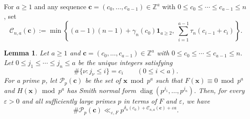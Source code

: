 \documentclass[a4paper,11pt, twoside,reqno]{amsart}
\theoremstyle{plain}
\newtheorem{lemma}[thm]{Lemma}
\theoremstyle{definition}
\theoremstyle{remark}
\newcommand{\bfx}{\bm{x}}
\newcommand{\bfc}{\bm{c}}
\newcommand{\ZZ}{\mathbb{Z}}
\newcommand{\ve}{\varepsilon}
\renewcommand{\le}{\leqslant}
\renewcommand{\leq}{\leqslant}
\renewcommand{\ge}{\geqslant}
\renewcommand{\geq}{\geqslant}
\newcommand{\diag}{\operatorname{diag}}
\numberwithin{equation}{section}
\begin{document}
For \(a\geq1\) and any sequence $\bfc=(c_0,\ldots,c_{a-1})\in \ZZ^a$
with $0\leq c_0\leq\cdots\leq c_{a-1}\leq n$,
set
\begin{equation}
\label{eq:q-profile-cost}
\mathcal C_{n,a}(\bfc)
:= \min\left\{
(a-1)(n-1)+\gamma_n(c_0)\bm{1}_{a\ge 2},\;
\sum_{i=1}^{a-1}\tau_n(c_{i-1}+c_i)
\right\}.
\end{equation}


\begin{lemma}\label{lem:q-profile}
Let $a\ge1$ and $\bfc=(c_0,\ldots,c_{a-1})\in\ZZ^a$
with $0\le c_0\le\cdots\le c_{a-1}\le n$.
Let $0\le j_1\le\cdots\le j_n\le a$ be the unique integers
satisfying
\[
\#\{\nu:j_\nu\le i\}=c_i
\qquad(0\le i<a).
\]
For a prime $p$, let $\mathcal P_p(\bfc)$ be the set of
$\bfx\bmod p^a$ such that $F(\bfx)\equiv0\bmod p^a$
and $H(\bfx)\bmod p^a$ has Smith normal form
$\diag(p^{j_1},\ldots,p^{j_n})$.
Then, for every $\ve>0$ and all sufficiently large primes $p$
in terms of $F$ and $\ve$, we have
\[
\#\mathcal P_p(\bfc)
\ll_{\ve,F}
p^{\delta_n(c_0)+\mathcal C_{n,a}(\bfc)+\ve a}.
\]
\end{lemma}
\end{document}
